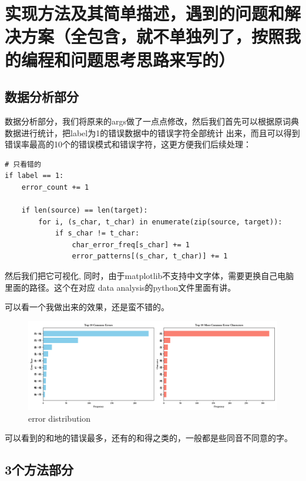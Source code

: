 \documentclass[answers]{exam}  %
\begin{document}
\section{实现方法及其简单描述，遇到的问题和解决方案（全包含，就不单独列了，按照我的编程和问题思考思路来写的）}
\subsection{数据分析部分}
数据分析部分，我们将原来的args做了一点点修改，然后我们首先可以根据原词典数据进行统计，把label为1的错误数据中的错误字符全部统计
出来，而且可以得到错误率最高的10个的错误模式和错误字符，这更方便我们后续处理：
\begin{lstlisting}
# 只看错的
if label == 1:  
    error_count += 1
    
    if len(source) == len(target):  
        for i, (s_char, t_char) in enumerate(zip(source, target)):
            if s_char != t_char:
                char_error_freq[s_char] += 1
                error_patterns[(s_char, t_char)] += 1
\end{lstlisting}
然后我们把它可视化, 同时，由于matplotlib不支持中文字体，需要更换自己电脑里面的路径。这个在对应
data analysis的python文件里面有讲。

可以看一个我做出来的效果，还是蛮不错的。
\begin{figure}[h]
    \centering
    \label{error_distribution}
    \includegraphics[width=1\textwidth]{../pic/error_distribution.png} 
    \caption{error distribution}  
\end{figure}
可以看到的和地的错误最多，还有的和得之类的，一般都是些同音不同意的字。

\subsection{3个方法部分}
\end{document}

